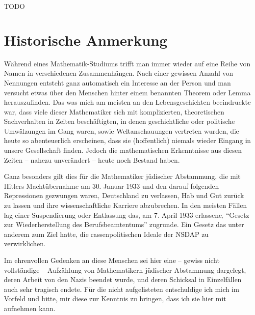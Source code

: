 TODO



\section{Historische Anmerkung}

Während eines Mathematik-Studiums trifft man immer wieder auf eine Reihe von Namen in verschiedenen Zusammenhängen. Nach einer gewissen Anzahl von Nennungen entsteht ganz automatisch ein Interesse an der Person und man versucht etwas über den Menschen hinter einem benannten Theorem oder Lemma herauszufinden. Das was mich am meisten an den Lebensgeschichten beeindruckte war, dass viele dieser Mathematiker sich mit komplizierten, theoretischen Sachverhalten in Zeiten beschäftigten, in denen geschichtliche oder politische Umwälzungen im Gang waren, sowie Weltanschauungen vertreten wurden, die heute so abenteuerlich erscheinen, dass sie (hoffentlich) niemals wieder Eingang in unsere Gesellschaft finden. Jedoch die mathematischen Erkenntnisse aus diesen Zeiten -- nahezu unverändert -- heute noch Bestand haben. 

Ganz besonders gilt dies für die Mathematiker jüdischer Abstammung, die mit Hitlers Machtübernahme am 30. Januar 1933 und den darauf folgenden Repressionen gezwungen waren, Deutschland zu verlassen, Hab und Gut zurück zu lassen und ihre wissenschaftliche Karriere abzubrechen. In den meisten Fällen lag einer Suspendierung oder Entlassung das, am 7. April 1933 erlassene, "`Gesetz zur Wiederherstellung des Berufsbeamtentums"' zugrunde. Ein Gesetz das unter anderem zum Ziel hatte, die rassenpolitischen Ideale der NSDAP zu verwirklichen. 

Im ehrenvollen Gedenken an diese Menschen sei hier eine -- gewiss nicht vollständige -- Aufzählung von Mathematikern jüdischer Abstammung dargelegt, deren Arbeit von den Nazis beendet wurde, und deren Schicksal in Einzelfällen auch sehr tragisch endete. Für die nicht aufgelisteten entschuldige ich mich im Vorfeld und bitte, mir diese zur Kenntnis zu bringen, dass ich sie hier mit aufnehmen kann.


